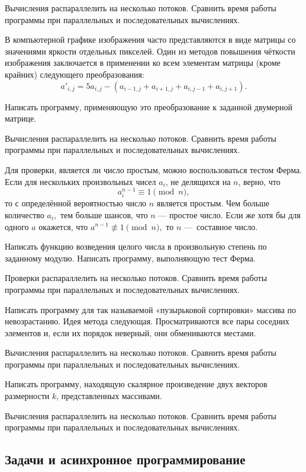 Вычисления распараллелить на несколько потоков. Сравнить время работы
программы при параллельных и последовательных вычислениях.

\task В компьютерной графике изображения часто представляются в виде
матрицы со значениями яркости отдельных пикселей. Один из методов
повышения чёткости изображения заключается в применении ко всем
элементам матрицы (кроме крайних) следующего преобразования:
\[
a'_{i,j} = 5a_{i,j} - \left(
  a_{i-1, j} + a_{i+1, j} + a_{i, j-1} + a_{i, j+1}
\right).
\]

Написать программу, применяющую это преобразование к заданной
двумерной матрице.

Вычисления распараллелить на несколько потоков. Сравнить время работы
программы при параллельных и последовательных вычислениях.

\task Для проверки, является ли число простым, можно воспользоваться
тестом Ферма. Если для нескольких произвольных чисел $a_i$, не
делящихся на $n$, верно, что
\[
a_i^{n-1} \equiv 1 \pmod n,
\]
то с определённой вероятностью число $n$ является простым. Чем больше
количество $a_i,$ тем больше шансов, что $n$ — простое число. Если же
хотя бы для одного $a$ окажется, что $a^{n-1}\not\equiv1 \pmod n,$ то
$n$ — составное число.

Написать функцию возведения целого числа в произвольную степень по
заданному модулю. Написать программу, выполняющую тест Ферма.

Проверки распараллелить на несколько потоков. Сравнить время работы
программы при параллельных и последовательных вычислениях.

\task Написать программу для так называемой «пузырьковой сортировки»
массива по невозрастанию. Идея метода следующая. Просматриваются все пары
соседних элементов и, если их порядок неверный, они обмениваются
местами.

Вычисления распараллелить на несколько потоков. Сравнить время работы
программы при параллельных и последовательных вычислениях.

\task Написать программу, находящую скалярное произведение двух
векторов размерности $k$, представленных массивами.

Вычисления распараллелить на несколько потоков. Сравнить время работы
программы при параллельных и последовательных вычислениях.


\subsection{Задачи и асинхронное программирование}

\task

\task

\task

\task

\task

\task

\task

\task

\task

\task

